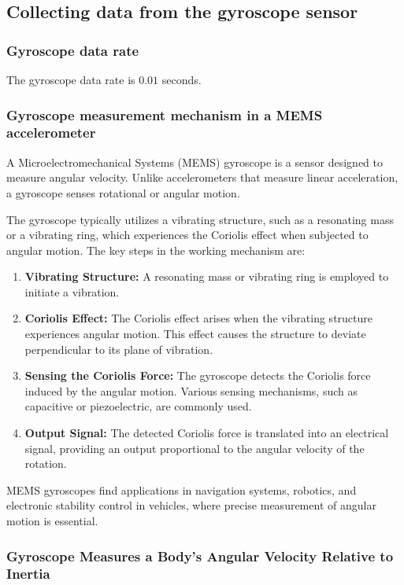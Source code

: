 \subsection{Collecting data from the gyroscope sensor}
\subsubsection{Gyroscope data rate}
The gyroscope data rate is $0.01$ seconds.

\subsubsection{Gyroscope measurement mechanism in a MEMS accelerometer}
A Microelectromechanical Systems (MEMS) gyroscope is a sensor designed to measure angular velocity. Unlike accelerometers that measure linear acceleration, a gyroscope senses rotational or angular motion.

The gyroscope typically utilizes a vibrating structure, such as a resonating mass or a vibrating ring, which experiences the Coriolis effect when subjected to angular motion. The key steps in the working mechanism are:

\begin{enumerate}
    \item \textbf{Vibrating Structure:} A resonating mass or vibrating ring is employed to initiate a vibration.
    
    \item \textbf{Coriolis Effect:} The Coriolis effect arises when the vibrating structure experiences angular motion. This effect causes the structure to deviate perpendicular to its plane of vibration.
    
    \item \textbf{Sensing the Coriolis Force:} The gyroscope detects the Coriolis force induced by the angular motion. Various sensing mechanisms, such as capacitive or piezoelectric, are commonly used.
    
    \item \textbf{Output Signal:} The detected Coriolis force is translated into an electrical signal, providing an output proportional to the angular velocity of the rotation.
\end{enumerate}

MEMS gyroscopes find applications in navigation systems, robotics, and electronic stability control in vehicles, where precise measurement of angular motion is essential.

\subsubsection{Gyroscope Measures a Body's Angular Velocity Relative to Inertia}

